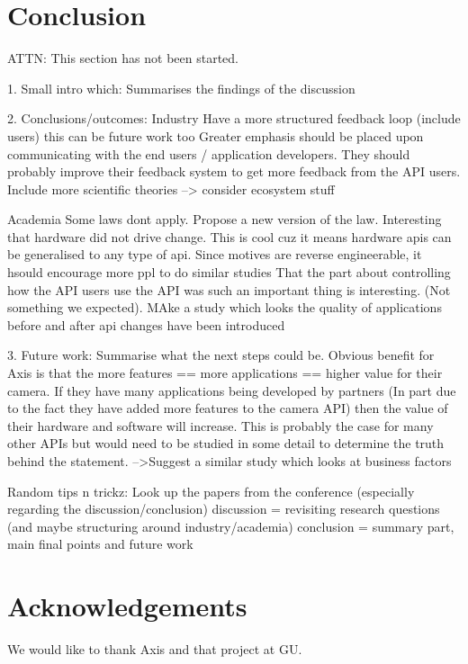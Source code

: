 \documentclass{sig-alternate}
\begin{document}
\section{Conclusion} \label{conclusion}
ATTN: This section has not been started. 

1. Small intro which: Summarises the findings of the discussion

2. Conclusions/outcomes:
Industry
Have a more structured feedback loop (include users) this can be future work too
              Greater emphasis should be placed upon communicating with the end users / application developers. They should probably improve their feedback system to get more feedback from the API users.
              Include more scientific theories
              --> consider ecosystem stuff

Academia
Some laws dont apply. Propose a new version of the law.
Interesting that hardware did not drive change. This is cool cuz it means hardware apis can be generalised to any type of api.
Since motives are reverse engineerable, it hsould encourage more ppl to do similar studies
That the part about controlling how the API users use the API was such an important thing is interesting. (Not something we expected). 
       MAke a study which looks the quality of applications before and after api changes have been introduced

3. Future work: Summarise what the next steps could be.
Obvious benefit for Axis is that the more features == more applications == higher value for their camera. If they have many applications being developed by partners (In part due to the fact they have added more features to the camera API) then the value of their hardware and software will increase. This is probably the case for many other APIs but would need to be studied in some detail to determine the truth behind the statement.
       -->Suggest a similar study which looks at business factors


Random tips n trickz:
       Look up the papers from the conference (especially regarding the discussion/conclusion)
       discussion = revisiting research questions (and maybe structuring around industry/academia)
       conclusion = summary part, main final points and future work 





\section{Acknowledgements}
We would like to thank Axis and that project at GU. 


 
\end{document}
